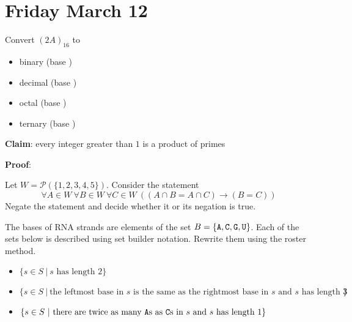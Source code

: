 \documentclass[12pt, oneside]{article}
\begin{document}
 





\newpage
\section*{Friday March 12}

Convert $(2A)_{16}$ to 
\begin{itemize}
\item binary (base \underline{\phantom{~~~2~~}})

\vspace{25pt}

\item decimal (base \underline{\phantom{~~10~~}})

\vspace{25pt}

\item octal (base \underline{\phantom{~~~8~~}})

\vspace{25pt}

\item ternary (base \underline{\phantom{~~~3~~}})

\vspace{25pt}

\end{itemize}


{\bf Claim}: every integer greater than $1$ is a product of primes

{\bf Proof}: 
\vfill

\newpage
Let $W = \mathcal{P}( \{ 1,2,3,4,5\})$. Consider the statement 
\[
\forall A \in W~ \forall B \in W ~ \forall C \in W~ ((A \cap B = A \cap C) \to (B=C) )
\]
Negate the statement and decide whether it or its negation is true.

\newpage
 The bases of RNA strands are elements of the set $B = \{\texttt{A}, \texttt{C}, \texttt{G}, \texttt{U} \}$. 
Each of the sets below is described using set builder notation. Rewrite them using the roster method. 
\begin{itemize}
\item $\{s \in S ~|~ s \text{ has length $2$} \}$ 

\vfill

\item $\{s \in S ~|~ \text{the leftmost base in $s$ is the same as the rightmost base in $s$ and 
$s$ has length $3$} \}$ 

\vfill

\item $\{s \in S ~|~ \text{there are twice as many $\texttt{A}$s as $\texttt{C}$s in $s$ and $s$ has length $1$} \}$ 

\vfill

\end{itemize}
\end{document}
